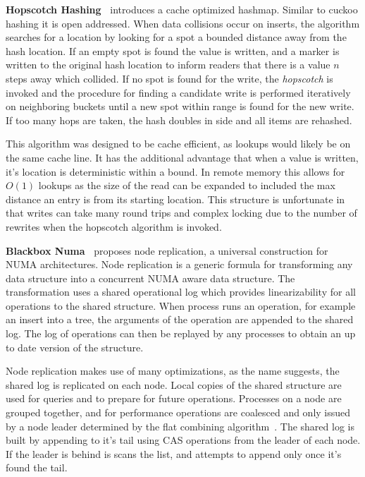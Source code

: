 \textbf{Hopscotch Hashing~\cite{hopscotch}} introduces a cache optimized
hashmap. Similar to cuckoo hashing it is open addressed. When data collisions
occur on inserts, the algorithm searches for a location by looking for a spot a
bounded distance away from the hash location. If an empty spot is found the
value is written, and a marker is written to the original hash location to
inform readers that there is a value $n$ steps away which collided. If no spot
is found for the write, the \textit{hopscotch} is invoked and the procedure for
finding a candidate write is performed iteratively on neighboring buckets until
a new spot within range is found for the new write. If too many hops are taken,
the hash doubles in side and all items are rehashed.

This algorithm was designed to be cache efficient, as lookups would likely be on
the same cache line. It has the additional advantage that when a value is
written, it's location is deterministic within a bound. In remote memory this
allows for $O(1)$ lookups as the size of the read can be expanded to included
the max distance an entry is from its starting location. This structure is
unfortunate in that writes can take many round trips and complex locking due to
the number of rewrites when the hopscotch algorithm is invoked.


\textbf{Blackbox Numa~\cite{black-box-numa}} proposes node replication, a
universal construction for NUMA architectures. Node replication is a generic
formula for transforming any data structure into a concurrent NUMA aware data
structure. The transformation uses a shared operational log which provides
linearizability for all operations to the shared structure. When process runs an
operation, for example an insert into a tree, the arguments of the operation are
appended to the shared log. The log of operations can then be replayed by any
processes to obtain an up to date version of the structure.

Node replication makes use of many optimizations, as the name suggests, the
shared log is replicated on each node. Local copies of the shared structure are
used for queries and to prepare for future operations. Processes on a node are
grouped together, and for performance operations are coalesced and only issued
by a node leader determined by the flat combining algorithm~\cite{flat-combine}.
The shared log is built by appending to it's tail using CAS operations from the
leader of each node. If the leader is behind is scans the list, and attempts to
append only once it's found the tail.

